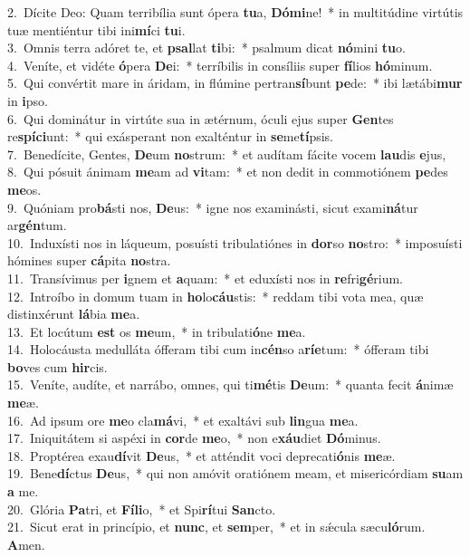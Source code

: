 {2.~}Dícite Deo: Quam terribília sunt ópera \textbf{tu}a, \textbf{Dó}\textbf{mi}ne!~* in multitúdine virtútis tuæ mentiéntur tibi ini\textbf{mí}ci \textbf{tu}i.\\
{3.~}Omnis terra adóret te, et \textbf{psal}lat \textbf{ti}bi:~* psalmum dicat \textbf{nó}mini \textbf{tu}o.\\
{4.~}Veníte, et vidéte \textbf{ó}pera \textbf{De}i:~* terríbilis in consíliis super \textbf{fí}lios \textbf{hó}minum.\\
{5.~}Qui convértit mare in áridam, in flúmine pertran\textbf{sí}bunt \textbf{pe}de:~* ibi lætábi\textbf{mur} in \textbf{i}pso.\\
{6.~}Qui dominátur in virtúte sua in ætérnum, óculi ejus super \textbf{Gen}tes re\textbf{spí}\textbf{ci}unt:~* qui exásperant non exalténtur in \textbf{se}me\textbf{tí}psis.\\
{7.~}Benedícite, Gentes, \textbf{De}um \textbf{no}strum:~* et audítam fácite vocem \textbf{lau}dis \textbf{e}jus,\\
{8.~}Qui pósuit ánimam \textbf{me}am ad \textbf{vi}tam:~* et non dedit in commotiónem \textbf{pe}des \textbf{me}os.\\
{9.~}Quóniam pro\textbf{bá}sti nos, \textbf{De}us:~* igne nos examinásti, sicut exami\textbf{ná}tur ar\textbf{gén}tum.\\
{10.~}Induxísti nos in láqueum, posuísti tribulatiónes in \textbf{dor}so \textbf{no}stro:~* imposuísti hómines super \textbf{cá}pita \textbf{no}stra.\\
{11.~}Transívimus per \textbf{i}gnem et \textbf{a}quam:~* et eduxísti nos in \textbf{re}fri\textbf{gé}rium.\\
{12.~}Introíbo in domum tuam in \textbf{ho}lo\textbf{cáu}stis:~* reddam tibi vota mea, quæ distinxérunt \textbf{lá}bia \textbf{me}a.\\
{13.~}Et locútum \textbf{est} os \textbf{me}um,~* in tribulati\textbf{ó}ne \textbf{me}a.\\
{14.~}Holocáusta medulláta ófferam tibi cum in\textbf{cén}so a\textbf{rí}\textbf{e}tum:~* ófferam tibi \textbf{bo}ves cum \textbf{hir}cis.\\
{15.~}Veníte, audíte, et narrábo, omnes, qui ti\textbf{mé}tis \textbf{De}um:~* quanta fecit \textbf{á}nimæ \textbf{me}æ.\\
{16.~}Ad ipsum ore \textbf{me}o cla\textbf{má}vi,~* et exaltávi sub \textbf{lin}gua \textbf{me}a.\\
{17.~}Iniquitátem si aspéxi in \textbf{cor}de \textbf{me}o,~* non e\textbf{xáu}diet \textbf{Dó}minus.\\
{18.~}Proptérea exau\textbf{dí}vit \textbf{De}us,~* et atténdit voci deprecati\textbf{ó}nis \textbf{me}æ.\\
{19.~}Bene\textbf{dí}ctus \textbf{De}us,~* qui non amóvit oratiónem meam, et misericórdiam \textbf{su}am \textbf{a} me.\\
{20.~}Glória \textbf{Pa}tri, et \textbf{Fí}\textbf{li}o,~* et Spi\textbf{rí}tui \textbf{San}cto.\\
{21.~}Sicut erat in princípio, et \textbf{nunc}, et \textbf{sem}per,~* et in sǽcula sæcu\textbf{ló}rum. \textbf{A}men.\\
